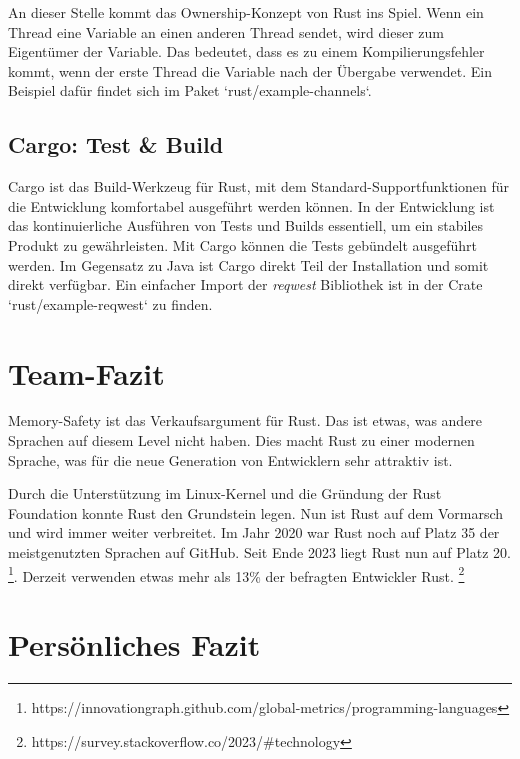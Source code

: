 \documentclass[letterpaper,12pt]{article}
\begin{document}
    An dieser Stelle kommt das Ownership-Konzept von Rust ins Spiel.
    Wenn ein Thread eine Variable an einen anderen Thread sendet, wird dieser zum Eigentümer der Variable.
    Das bedeutet, dass es zu einem Kompilierungsfehler kommt, wenn der erste Thread die Variable nach der Übergabe verwendet.
    Ein Beispiel dafür findet sich im Paket `rust/example-channels`.

    \subsection{Cargo: Test \& Build}\label{subsec:cargo:-test-&-build}
    Cargo ist das Build-Werkzeug für Rust, mit dem Standard-Supportfunktionen für die Entwicklung komfortabel ausgeführt werden können.
    In der Entwicklung ist das kontinuierliche Ausführen von Tests und Builds essentiell, um ein stabiles Produkt zu gewährleisten.
    Mit Cargo können die Tests gebündelt ausgeführt werden.
    Im Gegensatz zu Java ist Cargo direkt Teil der Installation und somit direkt verfügbar.
    Ein einfacher Import der \textit{reqwest} Bibliothek ist in der Crate `rust/example-reqwest` zu finden.

    \section{Team-Fazit}\label{sec:team-fazit}
    Memory-Safety ist das Verkaufsargument für Rust.
    Das ist etwas, was andere Sprachen auf diesem Level nicht haben.
    Dies macht Rust zu einer modernen Sprache, was für die neue Generation von Entwicklern sehr attraktiv ist.

    Durch die Unterstützung im Linux-Kernel und die Gründung der Rust Foundation konnte Rust den Grundstein legen.
    Nun ist Rust auf dem Vormarsch und wird immer weiter verbreitet.
    Im Jahr 2020 war Rust noch auf Platz 35 der meistgenutzten Sprachen auf GitHub.
    Seit Ende 2023 liegt Rust nun auf Platz 20. \footnote{https://innovationgraph.github.com/global-metrics/programming-languages}.
    Derzeit verwenden etwas mehr als 13\% der befragten Entwickler Rust. \footnote{https://survey.stackoverflow.co/2023/\#technology}

    \section{Persönliches Fazit}\label{sec:personliches-fazit}
\end{document}
